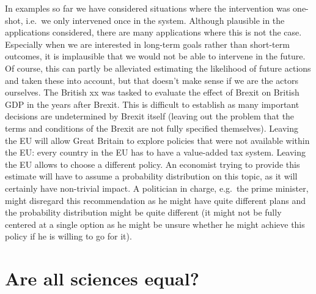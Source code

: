 \documentclass[
]{book}
\theoremstyle{definition}
\theoremstyle{definition}
\theoremstyle{definition}
\theoremstyle{remark}
\begin{document}
In examples so far we have considered situations where the intervention was one-shot, i.e.~we only intervened once in the system. Although plausible in the applications considered, there are many applications where this is not the case. Especially when we are interested in long-term goals rather than short-term outcomes, it is implausible that we would not be able to intervene in the future. Of course, this can partly be alleviated estimating the likelihood of future actions and taken these into account, but that doesn't make sense if we are the actors ourselves.
The British xx was tasked to evaluate the effect of Brexit on British GDP in the years after Brexit. This is difficult to establish as many important decisions are undetermined by Brexit itself (leaving out the problem that the terms and conditions of the Brexit are not fully specified themselves). Leaving the EU will allow Great Britain to explore policies that were not available within the EU: every country in the EU has to have a value-added tax system. Leaving the EU allows to choose a different policy. An economist trying to provide this estimate will have to assume a probability distribution on this topic, as it will certainly have non-trivial impact. A politician in charge, e.g.~the prime minister, might disregard this recommendation as he might have quite different plans and the probability distribution might be quite different (it might not be fully centered at a single option as he might be unsure whether he might achieve this policy if he is willing to go for it).

\hypertarget{are-all-sciences-equal}{%
\section{Are all sciences equal?}\label{are-all-sciences-equal}}
\end{document}
